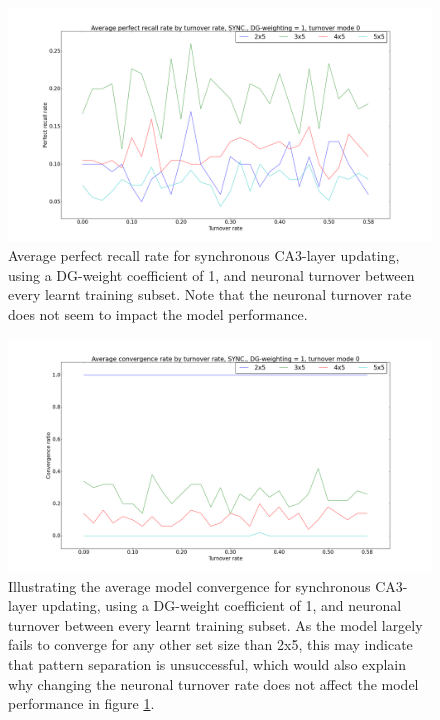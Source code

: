 \begin{figure}
    \centering
    \includegraphics[width=14cm]{fig/average_perfect_recall_rates_by_set_size_sync_dgw_1_t_m_0_no_err_bars}
    \caption{Average perfect recall rate for synchronous CA3-layer updating, using a DG-weight coefficient of 1, and neuronal turnover between every learnt training subset. Note that the neuronal turnover rate does not seem to impact the model performance.}
    \label{fig:average_perfect_recall_rates_by_set_size_sync_dgw_1_t_m_0_no_err_bars}
\end{figure}

\begin{figure}
    \centering
    \includegraphics[width=14cm]{fig/avg_convergence_by_turnover_rate_sync_dgw_1_t_m_0_no_err_bars}
    \caption{Illustrating the average model convergence for synchronous CA3-layer updating, using a DG-weight coefficient of 1, and neuronal turnover between every learnt training subset. As the model largely fails to converge for any other set size than 2x5, this may indicate that pattern separation is unsuccessful, which would also explain why changing the neuronal turnover rate does not affect the model performance in figure \ref{fig:average_perfect_recall_rates_by_set_size_sync_dgw_1_t_m_0_no_err_bars}.}
    \label{fig:avg_convergence_by_turnover_rate_sync_dgw_1_t_m_0_no_err_bars}
\end{figure}

